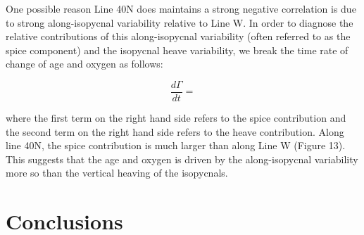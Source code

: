 \documentclass{ametsoc}
\begin{document}
One possible reason Line 40N does maintains a strong negative correlation is due to strong along-isopycnal variability relative to Line W. In order to diagnose the relative contributions of this along-isopycnal variability (often referred to as the spice component) and the isopycnal heave variability, we break the time rate of change of age and oxygen as follows:

\begin{equation}
  \frac{d \Gamma}{dt} = 
\end{equation}

where the first term on the right hand side refers to the spice contribution and the second term on the right hand side refers to the heave contribution. Along line 40N, the spice contribution is much larger than along Line W (Figure 13). This suggests that the age and oxygen is driven by the along-isopycnal variability more so than the vertical heaving of the isopycnals.

\section{Conclusions}





 
 


\end{document}
